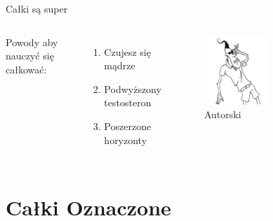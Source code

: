 \documentclass[aspectratio=169,xcolor=dvipsnames]{beamer}
\begin{document}



\begin{frame}{Całki są super}
    \begin{columns}[c]
    
        Powody aby nauczyć się całkować:
        \begin{enumerate}
            \item Czujesz się mądrze
            \item Podwyższony testosteron
            \item Poszerzone horyzonty
        \end{enumerate}

        \begin{figure}
            \centering
            \includegraphics[width=0.5\textwidth]{cool.png}
            \caption{\label{fig:cool}Autorski}
        \end{figure}

    \end{columns}
\end{frame}

\section{Całki Oznaczone}
\end{document}
